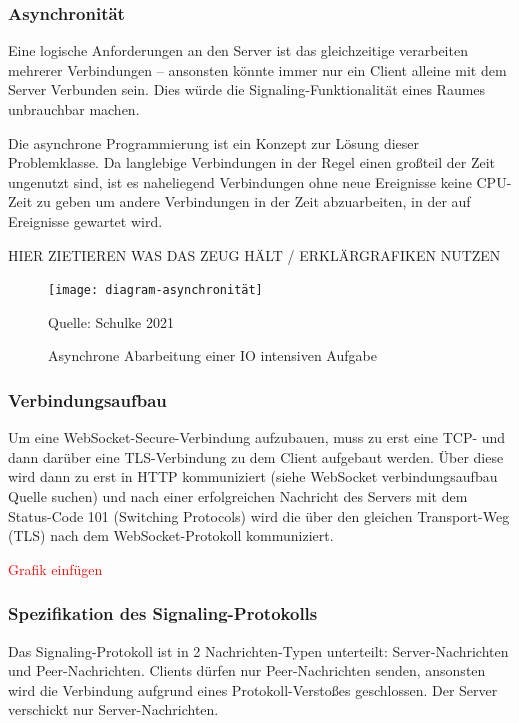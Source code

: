 \documentclass{article}
\newcommand{\figuresource}[1]{
	\begin{center}Quelle: #1\end{center}
}
\begin{document}
\begin{onecolumn}
\subsubsection*{Asynchronität}

Eine logische Anforderungen an den Server ist das gleichzeitige verarbeiten
mehrerer Verbindungen – ansonsten könnte immer nur ein Client alleine mit dem
Server Verbunden sein. Dies würde die Signaling-Funktionalität eines Raumes
unbrauchbar machen.

Die asynchrone Programmierung ist ein Konzept zur Lösung dieser Problemklasse.
Da langlebige Verbindungen in der Regel einen großteil der Zeit ungenutzt sind,
ist es naheliegend Verbindungen ohne neue Ereignisse keine CPU-Zeit zu geben
um andere Verbindungen in der Zeit abzuarbeiten, in der auf Ereignisse gewartet
wird.

HIER ZIETIEREN WAS DAS ZEUG HÄLT / ERKLÄRGRAFIKEN NUTZEN

\begin{figure}[ht]
	\texttt{[image: diagram-asynchronität]}
	\centering
	\caption{Asynchrone Abarbeitung einer IO intensiven Aufgabe}
	\figuresource{Schulke 2021}
\end{figure}

\subsubsection{Verbindungsaufbau}

Um eine WebSocket-Secure-Verbindung aufzubauen, muss zu erst eine TCP- und dann
darüber eine TLS-Verbindung zu dem Client aufgebaut werden. Über diese wird
dann zu erst in HTTP kommuniziert (siehe WebSocket verbindungsaufbau Quelle
suchen) und nach einer erfolgreichen Nachricht des Servers mit dem Status-Code
101 (Switching Protocols) wird die über den gleichen Transport-Weg (TLS)
nach dem WebSocket-Protokoll kommuniziert.

\textcolor{red}{Grafik einfügen}

\subsubsection{Spezifikation des Signaling-Protokolls}

Das Signaling-Protokoll ist in 2 Nachrichten-Typen unterteilt:
Server-Nachrichten und Peer-Nachrichten. Clients dürfen nur Peer-Nachrichten
senden, ansonsten wird die Verbindung aufgrund eines Protokoll-Verstoßes
geschlossen. Der Server verschickt nur Server-Nachrichten.


\end{onecolumn}
\end{document}
